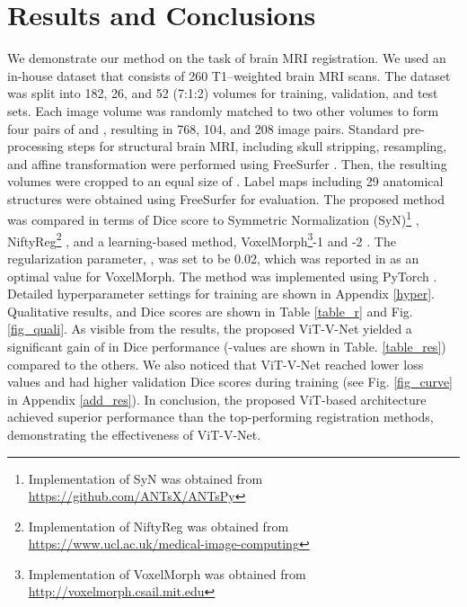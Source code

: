 \documentclass{midl}
\begin{document}
\section{Results and Conclusions}
\vspace{-1.5mm}
We demonstrate our method on the task of brain MRI registration. We used an in-house dataset that consists of 260 T1–weighted brain MRI scans. The dataset was split into 182, 26, and 52 (7:1:2) volumes for training, validation, and test sets. Each image volume was randomly matched to two other volumes to form four pairs of  and , resulting in 768, 104, and 208 image pairs. Standard pre-processing steps for structural brain MRI, including skull stripping, resampling, and affine transformation were performed using FreeSurfer \cite{fischl2012freesurfer}. Then, the resulting volumes were cropped to an equal size of . Label maps including 29 anatomical structures were obtained using FreeSurfer for evaluation. The proposed method was compared in terms of Dice score \cite{dice1945measures} to Symmetric Normalization (SyN)\footnote{Implementation of SyN was obtained from \url{https://github.com/ANTsX/ANTsPy}} \cite{avants2008symmetric}, NiftyReg\footnote{Implementation of NiftyReg was obtained from \url{https://www.ucl.ac.uk/medical-image-computing}} \cite{modat2010fast}, and a learning-based method, VoxelMorph\footnote{Implementation of VoxelMorph was obtained from \url{http://voxelmorph.csail.mit.edu}}-1 and -2 \cite{balakrishnan2018unsupervised}. The regularization parameter, , was set to be 0.02, which was reported in \cite{balakrishnan2018unsupervised} as an optimal value for VoxelMorph. The method was implemented using PyTorch \cite{NEURIPS2019_9015}. Detailed hyperparameter settings for training are shown in Appendix \ref{hyper}. Qualitative results, and Dice scores are shown in Table \ref{table_r} and Fig. \ref{fig_quali}. As visible from the results, the proposed ViT-V-Net yielded a significant gain of  in Dice performance (-values are shown in Table. \ref{table_res}) compared to the others. We also noticed that ViT-V-Net reached lower loss values and had higher validation Dice scores during training (see Fig. \ref{fig_curve} in Appendix \ref{add_res}). In conclusion, the proposed ViT-based architecture achieved superior performance than the top-performing registration methods, demonstrating the effectiveness of ViT-V-Net.


\end{document}
